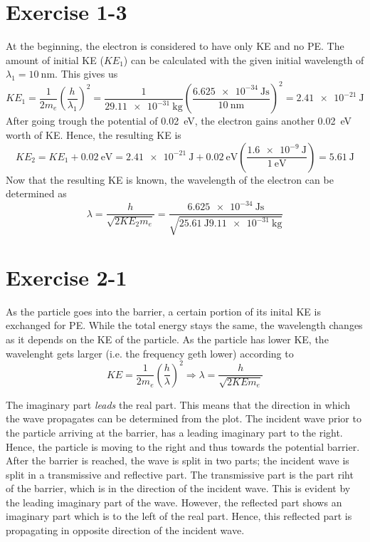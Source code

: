 \section{Exercise 1-3}
At the beginning, the electron is considered to have only KE and no PE. The
amount of initial KE ($KE_1$) can be calculated with the given initial
wavelength of $\lambda_1 = \SI{10}{\nano\meter}$. This gives us
\[
	KE_1
	= \frac{1}{2 m_e} \left(\frac{h}{\lambda_1}\right)^2
	= \frac{1}{2 \SI{9.11e-31}{\kg}} \left(\frac{\SI{6.625e-34}{\joule\second}}{\SI{10}{\nano\meter}}\right)^2
	= \SI{2.41e-21}{\joule}
\]
After going trough the potential of \SI{0.02}{\eV}, the electron gains
another \SI{0.02}{\eV} worth of KE. Hence, the resulting KE is
\[
	KE_2
	= KE_1 + \SI{0.02}{\eV}
	= \SI{2.41e-21}{\joule} + \SI{0.02}{\eV}\left(\frac{\SI{1.6e-9}{\joule}}{\SI{1}{\eV}}\right)
	= \SI{5.61}{\joule}
\]
Now that the resulting KE is known, the wavelength of the electron can be
determined as
\[
	\lambda
	= \frac{h}{\sqrt{2 KE_2 m_e}}
	= \frac{\SI{6.625e-34}{\joule\second}}{\sqrt{2 \SI{5.61}{\joule} \SI{9.11e-31}{\kg}}}
\]



\newpage
\section{Exercise 2-1}
As the particle goes into the barrier, a certain portion of its inital KE
is exchanged for PE. While the total energy stays the same, the wavelength
changes as it depends on the KE of the particle. As the particle has lower
KE, the wavelenght gets larger (i.e. the frequency geth lower) according to
\[
	KE = \frac{1}{2 m_e} \left(\frac{h}{\lambda}\right)^2
	\Rightarrow
	\lambda = \frac{h}{\sqrt{2 KE m_e}}
\]

The imaginary part \emph{leads} the real part. This means that the direction
in which the wave propagates can be determined from the plot. The incident
wave prior to the particle arriving at the barrier, has a leading imaginary
part to the right. Hence, the particle is moving to the right and thus
towards the potential barrier. After the barrier is reached, the wave is
split in two parts; the incident wave is split in a transmissive and
reflective part. The transmissive part is the part riht of the barrier, which
is in the direction of the incident wave. This is evident by the leading
imaginary part of the wave. However, the reflected part shows an imaginary
part which is to the left of the real part. Hence, this reflected part is
propagating in opposite direction of the incident wave.

